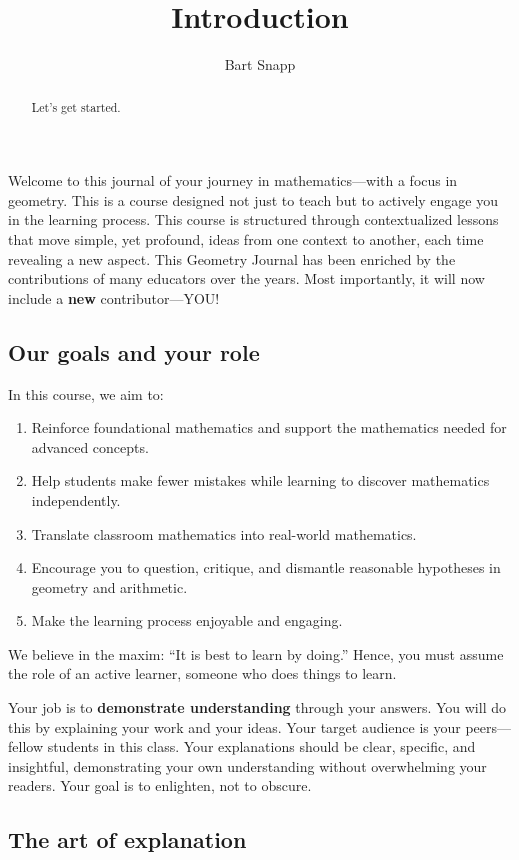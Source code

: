 \documentclass[handout,nooutcomes,noauthor,12pt]{ximera}
\title{Introduction}
\author{Bart Snapp}
\begin{document}
\begin{abstract}
  Let's get started.
\end{abstract}
\maketitle

Welcome to this journal of your journey in mathematics---with a focus in
geometry. This is a course designed not just to teach but to actively engage
you in the learning process. This course is structured through contextualized
lessons that move simple, yet profound, ideas from  one context to another,
each time revealing a new aspect. This Geometry Journal has been enriched by the
contributions of many educators over the years. Most importantly, it will now
include a \textbf{new} contributor---YOU!

\subsection*{Our goals and your role}

In this course, we aim to:
\begin{enumerate}
  \item Reinforce foundational mathematics and support the mathematics needed
        for
        advanced concepts.
  \item Help students make fewer mistakes while learning to discover
        mathematics
        independently.
  \item Translate classroom mathematics into real-world mathematics.
  \item Encourage you to question, critique, and dismantle reasonable
        hypotheses in geometry and arithmetic.
  \item Make the learning process enjoyable and engaging.
\end{enumerate}

We believe in the maxim: ``It is best to learn by doing.'' Hence, you must
assume the  role  of an active learner, someone who does things to learn.

Your job is to \textbf{demonstrate understanding} through your
answers. You will do this by explaining your work and your ideas.
Your target audience is your peers—fellow students in this class. Your
explanations should be clear, specific, and insightful, demonstrating
your own understanding without overwhelming your readers. Your goal is
to enlighten, not to obscure.

\subsection*{The art of explanation}
\end{document}
